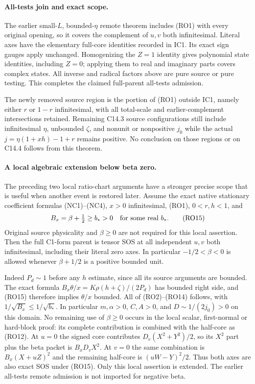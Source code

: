 \paragraph{All-tests join and exact scope.}
The earlier small-$L$, bounded-$\eta$ remote theorem includes (RO1)
with every original opening, so it covers the complement of
$u,v$ both infinitesimal. Literal axes have the elementary full-core
identities recorded in IC1. Its exact sign gauges apply unchanged.
Homogenizing the $Z=1$ identity gives polynomial state identities,
including $Z=0$; applying them to real and imaginary parts covers
complex states. All inverse and radical factors above are pure
source or pure testing. This completes the claimed full-parent
all-tests admission.

The newly removed source region is the portion of (RO1) outside IC1,
namely either $r$ or $1-r$ infinitesimal, with all total-scale and
earlier-complement intersections retained. Remaining C14.3 source
configurations still include infinitesimal $\eta$, unbounded
$\zeta$, and nonunit or nonpositive $j_0$ while the actual
$j=\eta(1+xh)-1+r$ remains positive. No conclusion on those
regions or on C14.4 follows from this theorem.

\paragraph{A local algebraic extension below beta zero.}
The preceding two local ratio-chart arguments have a stronger precise
scope that is useful when another event is restored later. Assume the
exact native stationary coefficient formulas (NC1)--(NC4),
$x>0$ infinitesimal, (RO1), $0<r,h<1$, and
\[
              B_x=\beta+\tfrac12\ge b_*>0
              \quad\hbox{for some real }b_* .                 \tag{RO15}
\]
Original source physicality and $\beta\ge0$ are not required for
this local assertion. Then the full C1-form parent is tensor SOS at
all independent $u,v$ both infinitesimal, including their literal
zero axes. In particular $-1/2<\beta<0$ is allowed whenever
$\beta+1/2$ is a positive bounded unit.

Indeed $P_d\sim1$ before any $h$ estimate, since all its source
arguments are bounded. The exact formula
$B_x\theta/x=K\rho(h+\zeta)/(2P_d)$ has bounded right side,
and (RO15) therefore implies $\theta/x$ bounded. All of (RO2)--(RO14)
follows, with $1/\sqrt{B_x}\le1/\sqrt{b_*}$. In particular
$m,\alpha>0$, $C,A>0$, and $D\sim1/(2j_0)>0$ on this
domain. No remaining use of $\beta\ge0$ occurs in the local
scalar, first-normal or hard-block proof: its complete contribution
is combined with the half-core as (RO12). At $u=0$ the signed
core contributes $D_v(X^2+Y^2)/2$, so its $X^2$ part plus
the beta packet is $B_xD_vX^2$. At $v=0$ the same combination
is $B_x(X+uZ)^2$ and the remaining half-core is
$(uW-Y)^2/2$. Thus both axes are also exact SOS under (RO15).
Only this local assertion is extended. The earlier all-tests remote
admission is not imported for negative beta.
